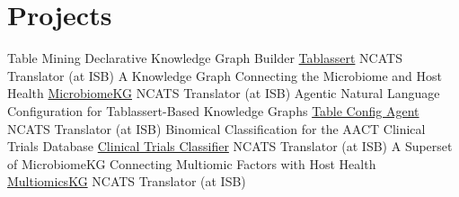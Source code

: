 \documentclass[11pt]{moderncv}
\begin{document}
\section{Projects}
\cventry
{}  %
{Table Mining Declarative Knowledge Graph Builder}  %
{\href{https://github.com/SkyeAv/Tablassert}{Tablassert}}  %
{NCATS Translator (at ISB)}  %
{}
{}
\cventry
{}  %
{A Knowledge Graph Connecting the Microbiome and Host Health}  %
{\href{https://www.frontiersin.org/journals/systems-biology/articles/10.3389/fsysb.2025.1544432/full}{MicrobiomeKG}}  %
{NCATS Translator (at ISB)}  %
{}
{}
\cventry
{}  %
{Agentic Natural Language Configuration for Tablassert-Based Knowledge Graphs}  %
{\href{https://github.com/SkyeAv/TableConfigAgent}{Table Config Agent}}  %
{NCATS Translator (at ISB)}  %
{}
{}
\cventry
{}  %
{Binomical Classification for the AACT Clinical Trials Database}  %
{\href{https://github.com/SkyeAv/CTClassifier}{Clinical Trials Classifier}}  %
{NCATS Translator (at ISB)}  %
{}
{}
\cventry
{}  %
{A Superset of MicrobiomeKG Connecting Multiomic Factors with Host Health}  %
{\href{https://github.com/glusman-team/MOKGConfiguration}{MultiomicsKG}}  %
{NCATS Translator (at ISB)}  %
{}
{}
\end{document}
